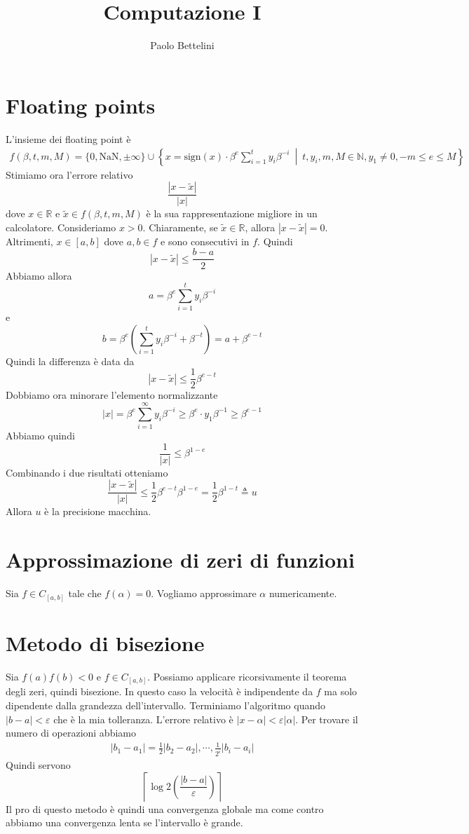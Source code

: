 \documentclass[a4paper]{article}
\title{Computazione I}
\author{Paolo Bettelini}
\date{}
\begin{document}
\maketitle
\tableofcontents

\section{Floating points}

L'insieme dei floating point è
\begin{align*}
    f(\beta, t, m, M) = \{0, \text{NaN}, \pm\infty\} \cup
    \left\{x = \text{sign}(x) \cdot \beta^e \sum_{i=1}^t y_i \beta^{-i} \ \middle|\ 
    t,y_i,m,M \in \mathbb{N}, y_1 \neq 0, -m\leq e \leq M \right\}
\end{align*}
Stimiamo ora l'errore relativo
\[
    \frac{|x-\tilde x|}{|x|}
\]
dove \(x\in\mathbb{R}\) e \(\tilde x \in f(\beta, t, m, M)\) è la sua rappresentazione migliore in un calcolatore.
Consideriamo \(x > 0\).
Chiaramente, se \(\tilde x \in \mathbb{R}\), allora \(|x-\tilde x| = 0\).
Altrimenti, \(x\in [a,b]\) dove \(a,b\in f\) e sono consecutivi in \(f\).
Quindi
\[
    |x-\tilde x| \leq \frac{b-a}{2}
\]
Abbiamo allora
\[
    a = \beta^e \sum_{i=1}^t y_i \beta^{-i}
\]
e
\[
    b = \beta^e \left( \sum_{i=1}^t y_i \beta^{-i} + \beta^{-t} \right)
    = a + \beta^{e - t}
\]
Quindi la differenza è data da
\[
    |x - \tilde x| \leq \frac{1}{2}\beta^{e-t}
\]
Dobbiamo ora minorare l'elemento normalizzante
\[
    |x| = \beta^e \sum_{i=1}^\infty y_i\beta^{-i} \geq \beta^e \cdot y_1 \beta^{-1} \geq \beta^{e-1}
\]
Abbiamo quindi
\[
    \frac{1}{|x|} \leq \beta^{1-e}
\]
Combinando i due risultati otteniamo
\[
    \frac{|x-\tilde x|}{|x|} \leq \frac{1}{2}\beta^{e-t} \beta^{1-e}
    = \frac{1}{2} \beta^{1-t} \triangleq u
\]
Allora \(u\) è la precisione macchina.

\section{Approssimazione di zeri di funzioni}

Sia \(f \in C_{[a,b]}\) tale che \(f(\alpha) = 0\). Vogliamo approssimare \(\alpha\) numericamente.

\section{Metodo di bisezione}

Sia \(f(a)f(b) < 0\) e \(f\in C_{[a,b]}\).
Possiamo applicare ricorsivamente il teorema degli zeri, quindi bisezione.
In questo caso la velocità è indipendente da \(f\) ma solo dipendente dalla grandezza
dell'intervallo. Terminiamo l'algoritmo quando \(|b-a| < \varepsilon\) che è la mia tolleranza.
L'errore relativo è \(|x-\alpha| < \varepsilon|\alpha|\).
Per trovare il numero di operazioni abbiamo
\begin{align*}
    |b_1 - a_1| = \frac{1}{2} |b_2 - a_2|, \cdots, \frac{1}{2^i}|b_i - a_i|
\end{align*}
Quindi servono
\[
    \left\lceil \log2 \left(\frac{|b-a|}{\varepsilon}\right) \right\rceil
\]
Il pro di questo metodo è quindi una convergenza globale ma come contro
abbiamo una convergenza lenta se l'intervallo è grande.
\end{document}
